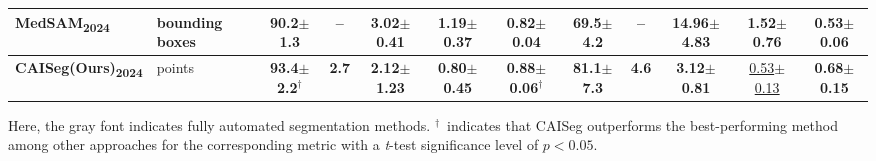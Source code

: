 \documentclass[journal,twoside,web]{ieeecolor}
\begin{document}
\begin{table*}[t]
{\begin{tabular}{l l c c c c c c c c c c}
MedSAM\textsubscript{2024} & bounding boxes & 90.2$\pm$1.3 & -- & 3.02$\pm$0.41 & 1.19$\pm$0.37 & 0.82$\pm$0.04 & 69.5$\pm$4.2 & -- & 14.96$\pm$4.83 & 1.52$\pm$0.76 & 0.53$\pm$0.06\\
\hline
\textbf{CAISeg(Ours)\textsubscript{2024}} & points & \textbf{93.4$\pm$2.2}$^\dagger$ & \textbf{2.7} & \textbf{2.12$\pm$1.23} & \textbf{0.80$\pm$0.45} & \textbf{0.88$\pm$0.06}$^\dagger$ & \textbf{81.1$\pm$7.3} & \textbf{4.6} & \textbf{3.12$\pm$0.81} & \underline{0.53$\pm$0.13} & \textbf{0.68$\pm$0.15}\\
\hline
\end{tabular}%
} %

\vspace{3pt}
\parbox{0.96\textwidth}{\footnotesize
Here, the gray font indicates fully automated segmentation methods. $^\dagger$~indicates that CAISeg outperforms the best-performing method among other approaches for the corresponding metric with a \emph{t}-test significance level of $p{<}0.05$.
}
\end{table*}
\end{document}
